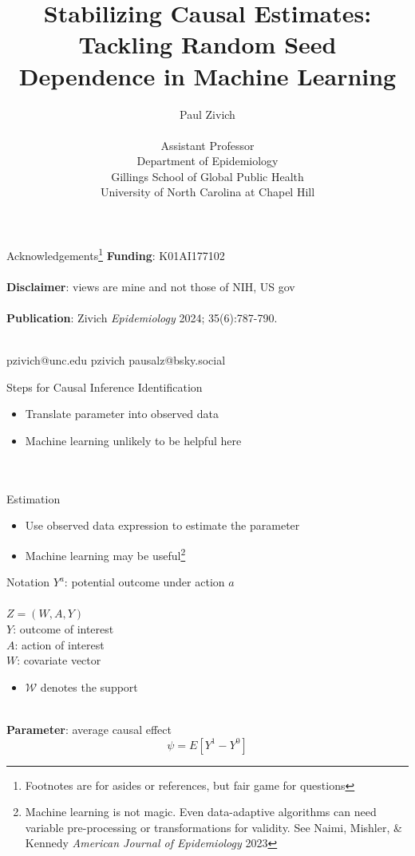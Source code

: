 \documentclass{beamer}
\title[Random Seeds]{Stabilizing Causal Estimates: Tackling Random Seed Dependence in Machine Learning}
\author[Paul Zivich]{Paul Zivich \\~\\ Assistant Professor \\ Department of Epidemiology \\ Gillings School of Global Public Health \\ University of North Carolina at Chapel Hill}
\begin{document}
	
\begin{frame}[plain]
	\maketitle
\end{frame}

\begin{frame}{Acknowledgements\footnote[frame]{Footnotes are for asides or references, but fair game for questions}}
	\textbf{Funding}: K01AI177102 \\~\\
	\textbf{Disclaimer}: views are mine and not those of NIH, US gov \\~\\
	\textbf{Publication}: Zivich \textit{Epidemiology} 2024; 35(6):787-790. \\~\\
	\begin{center}
		\small
		\faEnvelope \quad pzivich@unc.edu \qquad \quad 
		\faGithub \quad pzivich \qquad \quad
		\faHashtag \quad pausalz@bsky.social
	\end{center}
\end{frame}

\begin{frame}{Steps for Causal Inference}
	Identification
	\begin{itemize}
		\item Translate parameter into observed data
		\item Machine learning unlikely to be helpful here
	\end{itemize}
	~\\~\\
	Estimation
	\begin{itemize}
		\item Use observed data expression to estimate the parameter
		\item Machine learning may be useful\footnote[frame]{Machine learning is not magic. Even data-adaptive algorithms can need variable pre-processing or transformations for validity. See Naimi, Mishler, \& Kennedy \textit{American Journal of Epidemiology} 2023}
	\end{itemize}
\end{frame}

\begin{frame}{Notation}
	$Y^a$: potential outcome under action $a$ \\~\\
	$Z = (W,A,Y)$ \\
	$Y$: outcome of interest \\
	$A$: action of interest \\
	$W$: covariate vector 
	\begin{itemize}
		\item $\mathcal{W}$ denotes the support
	\end{itemize}
	~\\
	\textbf{Parameter}: average causal effect
	$$ \psi = E[Y^1 - Y^0] $$	
\end{frame}
\end{document}
